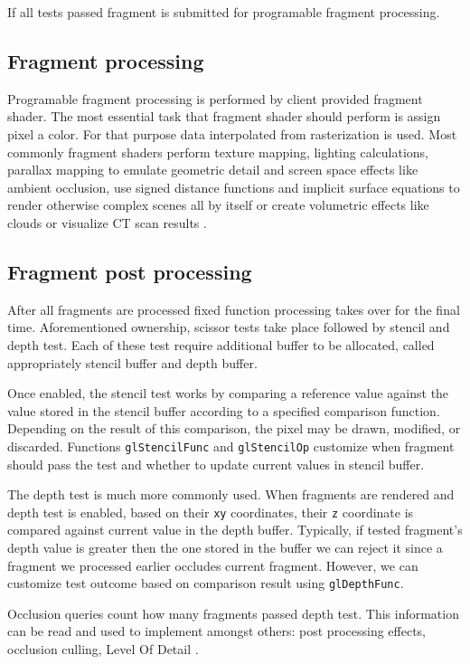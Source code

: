 If all tests passed fragment is submitted for programable fragment processing.

\subsection{Fragment processing}

Programable fragment processing is performed by client provided fragment shader. The most essential task that fragment shader should perform is assign pixel a color.
For that purpose data interpolated from rasterization is used. 
Most commonly fragment shaders perform texture mapping, lighting calculations, parallax mapping to emulate geometric detail and screen space effects like ambient occlusion, 
use signed distance functions and implicit surface equations to render otherwise complex scenes all by itself or create volumetric effects like clouds or visualize CT scan results \cite{rtrendering} \cite{glsuperbible}.

\subsection{Fragment post processing}

After all fragments are processed fixed function processing takes over for the final time.
Aforementioned ownership, scissor tests take place followed by stencil and depth test.
Each of these test require additional buffer to be allocated, called appropriately stencil buffer and depth buffer.

Once enabled, the stencil test works by comparing a reference value against the value stored in the stencil buffer according to a specified comparison function. 
Depending on the result of this comparison, the pixel may be drawn, modified, or discarded. 
Functions \texttt{glStencilFunc} and \texttt{glStencilOp} customize when fragment should pass the test and whether to update current values in stencil buffer.

The depth test is much more commonly used. 
When fragments are rendered and depth test is enabled, based on their \texttt{xy} coordinates, their \texttt{z} coordinate is compared against current value in the depth buffer.
Typically, if tested fragment's depth value is greater then the one stored in the buffer we can reject it since a fragment we processed earlier occludes current fragment.
However, we can customize test outcome based on comparison result using \texttt{glDepthFunc}.

Occlusion queries count how many fragments passed depth test. This information can be read and used to implement amongst others: post processing effects, occlusion culling, Level Of Detail \cite{rtrendering}.


